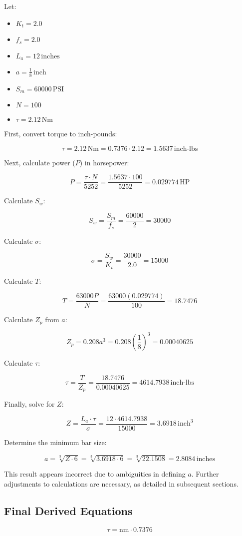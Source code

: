 Let:
\begin{itemize}
	\item \(K_t = 2.0\)
	\item \(f_s = 2.0\)
	\item \(L_a = 12 \, \text{inches}\)
	\item \(a = \frac{1}{8} \, \text{inch}\)
	\item \(S_m = 60000 \, \text{PSI}\)
	\item \(N = 100\)
	\item \(\tau = 2.12 \, \text{Nm}\)
\end{itemize}

First, convert torque to inch-pounds:

\[
\tau = 2.12 \, \text{Nm} = 0.7376 \cdot 2.12 = 1.5637 \, \text{inch-lbs}
\]

Next, calculate power (\(P\)) in horsepower:

\[
P = \frac{\tau \cdot N}{5252} = \frac{1.5637 \cdot 100}{5252} = 0.029774 \, \text{HP}
\]

Calculate \(S_w\):

\[
S_w = \frac{S_m}{f_s} = \frac{60000}{2} = 30000
\]

Calculate \(\sigma\):

\[
\sigma = \frac{S_w}{K_t} = \frac{30000}{2.0} = 15000
\]

Calculate \(T\):

\[
T = \frac{63000P}{N} = \frac{63000(0.029774)}{100} = 18.7476
\]

Calculate \(Z_p\) from \(a\):

\[
Z_p = 0.208a^3 = 0.208 \left(\frac{1}{8}\right)^3 = 0.00040625
\]

Calculate \(\tau\):

\[
\tau = \frac{T}{Z_p} = \frac{18.7476}{0.00040625} = 4614.7938 \, \text{inch-lbs}
\]

Finally, solve for \(Z\):

\[
Z = \frac{L_a \cdot \tau}{\sigma} = \frac{12 \cdot 4614.7938}{15000} = 3.6918 \, \text{inch}^3
\]

Determine the minimum bar size:

\[
a = \sqrt[3]{Z \cdot 6} = \sqrt[3]{3.6918 \cdot 6} = \sqrt[3]{22.1508} = 2.8084 \, \text{inches}
\]

This result appears incorrect due to ambiguities in defining \(a\). Further adjustments to calculations are necessary, as detailed in subsequent sections.

\subsection*{Final Derived Equations}
\[
\tau = \text{nm} \cdot 0.7376
\]

